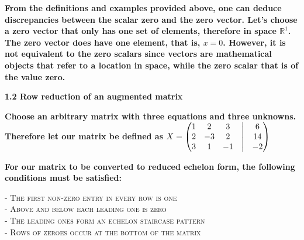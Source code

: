 \documentclass{article}
\begin{document}
	\textbf{From the definitions and examples provided above, one can deduce discrepancies between the scalar zero and the zero vector. Let's choose a zero vector that only has one set of elements, therefore in space $\mathbb R^1$. The zero vector does have one element, that is, $x=0$. However, it is not equivalent to the zero scalars since vectors are mathematical objects that refer to a location in space, while the zero scalar that is of the value zero.} 
	
	
		
	\clearpage
	
	\textbf{1.2 Row reduction of an augmented matrix}
	
	\textbf{Choose an arbitrary matrix with three equations and three unknowns.\\ 
		Therefore let our matrix be defined as 
		$ X = \begin{pmatrix}
			1 & 2 & 3 &\bigm| & 6 \\
			2 & -3 & 2 &\bigm| & 14 \\
			3 & 1 & -1 &\bigm| & -2 
		\end{pmatrix}$}
	
	\textbf{For our matrix to be converted to reduced echelon form, the following conditions must be satisfied:}
	
	\textsc{- The first non-zero entry in every row is one\\ - Above and below each leading one is zero\\ - The leading ones form an echelon staircase pattern\\ - Rows of zeroes occur at the bottom of the matrix}
	
\end{document}
